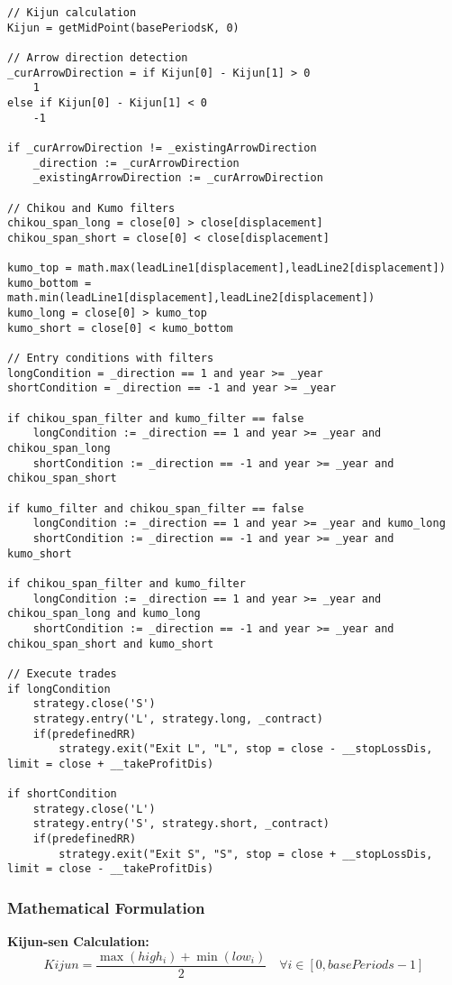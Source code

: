 \documentclass[12pt]{article}
\begin{document}
\begin{lstlisting}[language=Pine, caption=Pine Script Code for STRG-KijunArrow]
// Kijun calculation
Kijun = getMidPoint(basePeriodsK, 0)

// Arrow direction detection
_curArrowDirection = if Kijun[0] - Kijun[1] > 0
    1
else if Kijun[0] - Kijun[1] < 0
    -1

if _curArrowDirection != _existingArrowDirection
    _direction := _curArrowDirection
    _existingArrowDirection := _curArrowDirection

// Chikou and Kumo filters
chikou_span_long = close[0] > close[displacement]
chikou_span_short = close[0] < close[displacement]

kumo_top = math.max(leadLine1[displacement],leadLine2[displacement])
kumo_bottom = math.min(leadLine1[displacement],leadLine2[displacement])
kumo_long = close[0] > kumo_top
kumo_short = close[0] < kumo_bottom

// Entry conditions with filters
longCondition = _direction == 1 and year >= _year 
shortCondition = _direction == -1 and year >= _year

if chikou_span_filter and kumo_filter == false
    longCondition := _direction == 1 and year >= _year and chikou_span_long 
    shortCondition := _direction == -1 and year >= _year and chikou_span_short 

if kumo_filter and chikou_span_filter == false
    longCondition := _direction == 1 and year >= _year and kumo_long
    shortCondition := _direction == -1 and year >= _year and kumo_short

if chikou_span_filter and kumo_filter
    longCondition := _direction == 1 and year >= _year and chikou_span_long and kumo_long
    shortCondition := _direction == -1 and year >= _year and chikou_span_short and kumo_short

// Execute trades
if longCondition
    strategy.close('S')
    strategy.entry('L', strategy.long, _contract)
    if(predefinedRR)
        strategy.exit("Exit L", "L", stop = close - __stopLossDis, limit = close + __takeProfitDis)

if shortCondition
    strategy.close('L')
    strategy.entry('S', strategy.short, _contract)
    if(predefinedRR)
        strategy.exit("Exit S", "S", stop = close + __stopLossDis, limit = close - __takeProfitDis)
\end{lstlisting}

\subsubsection{Mathematical Formulation}
\textbf{Kijun-sen Calculation:}
\[
Kijun = \frac{\max(high_i) + \min(low_i)}{2} \quad \forall i \in [0, basePeriods-1]
\]
\end{document}
